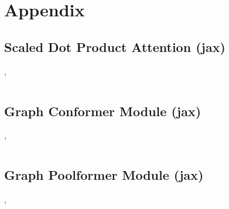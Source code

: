 \chapter{Appendix}
\label{sec:appendix}



% 

\newpage
\section{Scaled Dot Product Attention (jax)} \label{appendix:attention}
    \cite{selfPhysics}, 
    \inputminted[firstline=149, lastline=169]{python}{./../physics-code/models/metaformer.py}

\section{Graph Conformer Module (jax)} \label{appendix:graph-conformer}
    \cite{selfPhysics}, 
    \inputminted[firstline=242, lastline=284]{python}{./../physics-code/models/metaformer.py}

\newpage
\section{Graph Poolformer Module (jax)} \label{appendix:graph-poolformer}
    \cite{selfPhysics}, 
    \inputminted[firstline=211, lastline=239]{python}{./../physics-code/models/metaformer.py}
    
